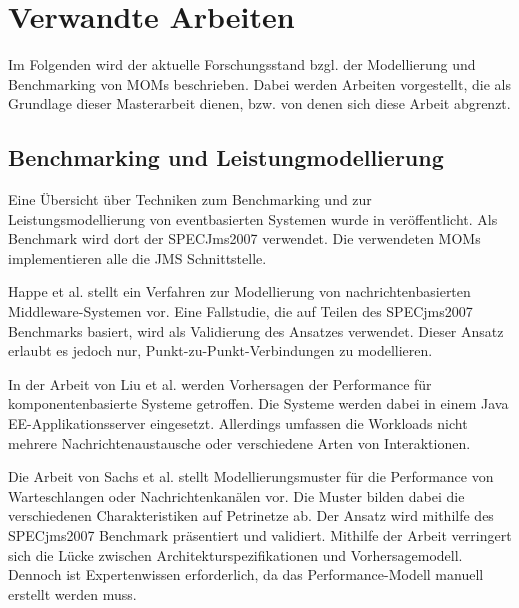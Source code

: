 
\chapter{Verwandte Arbeiten}
\label{ch:Verwandte}
Im Folgenden wird der aktuelle Forschungsstand bzgl. der Modellierung und Benchmarking von MOMs beschrieben. Dabei werden Arbeiten vorgestellt, die als Grundlage dieser Masterarbeit dienen, bzw. von denen sich diese Arbeit abgrenzt.

\section{Benchmarking und Leistungmodellierung}
Eine Übersicht über Techniken zum Benchmarking und zur Leistungsmodellierung von eventbasierten Systemen wurde in \cite{Kounev2009} veröffentlicht. Als Benchmark wird dort der SPECJms2007 verwendet. Die verwendeten MOMs implementieren alle die JMS Schnittstelle. \par
Happe et al. \cite{happe} stellt ein Verfahren zur Modellierung von nachrichtenbasierten Middleware-Systemen vor. 
Eine Fallstudie, die auf Teilen des SPECjms2007 Benchmarks basiert, wird als Validierung des Ansatzes verwendet. Dieser Ansatz erlaubt es jedoch nur, Punkt-zu-Punkt-Verbindungen zu modellieren. \par
In der Arbeit von Liu et al. \cite{Liu2005} werden Vorhersagen der Performance für komponentenbasierte Systeme getroffen. Die Systeme werden dabei in einem Java EE-Applikationsserver eingesetzt. Allerdings umfassen die Workloads nicht mehrere Nachrichtenaustausche oder verschiedene Arten von Interaktionen. \par
Die Arbeit von Sachs et al. \cite{Sachs2013} stellt Modellierungsmuster für die Performance von Warteschlangen oder Nachrichtenkanälen vor. Die Muster bilden dabei die verschiedenen Charakteristiken auf Petrinetze ab. Der Ansatz wird mithilfe des SPECjms2007 Benchmark präsentiert und validiert. Mithilfe der Arbeit verringert sich die Lücke zwischen Architekturspezifikationen und Vorhersagemodell. Dennoch ist Expertenwissen erforderlich, da das Performance-Modell manuell erstellt werden muss. \par
